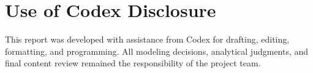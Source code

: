 \section{Use of Codex Disclosure}

This report was developed with assistance from Codex for drafting, editing, formatting, and programming.
All modeling decisions, analytical judgments, and final content review remained the responsibility of the project team.
